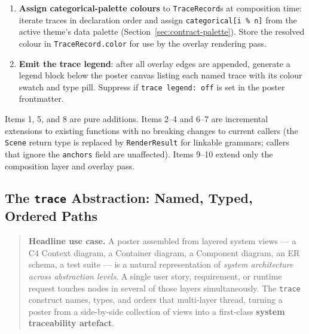 \begin{enumerate}
  \item \textbf{Assign categorical-palette colours} to \texttt{TraceRecord}s
        at composition time: iterate traces in declaration order and assign
        \texttt{categorical[i \% n]} from the active theme's data palette
        (Section~\ref{sec:contract-palette}).  Store the resolved colour in
        \texttt{TraceRecord.color} for use by the overlay rendering pass.

  \item \textbf{Emit the trace legend}: after all overlay edges are appended,
        generate a legend block below the poster canvas listing each named
        trace with its colour swatch and type pill.  Suppress if
        \texttt{trace legend: off} is set in the poster frontmatter.
\end{enumerate}

Items 1, 5, and 8 are pure additions.  Items 2--4 and 6--7 are incremental
extensions to existing functions with no breaking changes to current callers
(the \texttt{Scene} return type is replaced by \texttt{RenderResult} for
linkable grammars; callers that ignore the \texttt{anchors} field are
unaffected).  Items 9--10 extend only the composition layer and overlay pass.

\subsection{The \texttt{trace} Abstraction: Named, Typed, Ordered Paths}
\label{sec:cdl-trace}

\begin{quote}
\textbf{Headline use case.}  A poster assembled from layered system views ---
a C4 Context diagram, a Container diagram, a Component diagram, an ER schema,
a test suite --- is a natural representation of \emph{system architecture
across abstraction levels}.  A single user story, requirement, or runtime
request touches nodes in several of those layers simultaneously.  The
\texttt{trace} construct names, types, and orders that multi-layer thread,
turning a poster from a side-by-side collection of views into a first-class
\textbf{system traceability artefact}.
\end{quote}

